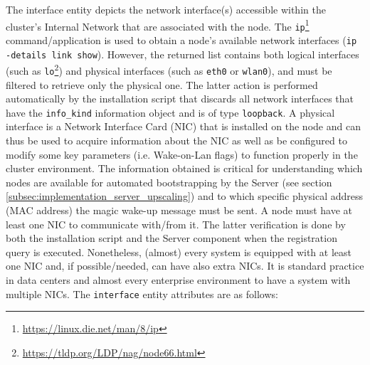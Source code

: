 The interface entity depicts the network interface(s) accessible within the cluster's
Internal Network that are associated with the node.
\newline
The \texttt{ip}\footnote{\url{https://linux.die.net/man/8/ip}} command/application
is used to obtain a node's available network interfaces (\texttt{ip -details link
show}). However, the returned list contains both logical interfaces (such as
\texttt{lo}\footnote{\url{https://tldp.org/LDP/nag/node66.html}}) and physical
interfaces (such as \texttt{eth0} or \texttt{wlan0}), and must be filtered to retrieve
only the physical one. The latter action is performed automatically by the
installation script that discards all network interfaces that have the \texttt{info\_kind}
information object and is of type \texttt{loopback}.
\newline
A physical interface is a Network Interface Card (NIC) that is installed on the node
and can thus be used to acquire information about the NIC as well as be configured
to modify some key parameters (i.e. Wake-on-Lan flags) to function properly in
the cluster environment. The information obtained is critical for understanding which
nodes are available for automated bootstrapping by the Server (see section
\ref{subsec:implementation_server_upscaling}) and to which specific physical address
(MAC address) the magic wake-up message must be sent.
\newline
A node must have at least one NIC to communicate with/from it. The latter verification
is done by both the installation script and the Server component when the registration
query is executed. Nonetheless, (almost) every system is equipped with at least one
NIC and, if possible/needed, can have also extra NICs. It is standard practice
in data centers and almost every enterprise environment to have a system with
multiple NICs.
\newline
The \texttt{interface} entity attributes are as follows:

